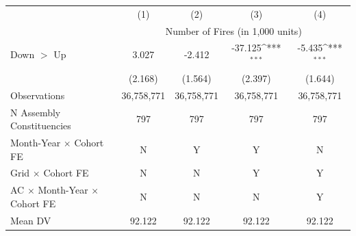 {
\def\sym#1{\ifmmode^{#1}\else\(^{#1}\)\fi}
\begin{tabular}{l*{4}{c}}
\hline
            &\multicolumn{1}{c}{(1)}         &\multicolumn{1}{c}{(2)}         &\multicolumn{1}{c}{(3)}         &\multicolumn{1}{c}{(4)}             \\
            & \multicolumn{4}{c}{Number of Fires (in 1,000 units)} \\ \hline

Down $>$ Up &       3.027         &      -2.412         &     -37.125\sym{***}&      -5.435\sym{***}\\
            &     (2.168)         &     (1.564)         &     (2.397)         &     (1.644)         \\
\hline
Observations&  36,758,771         &  36,758,771         &  36,758,771         &  36,758,771         \\
N Assembly Constituencies&         797         &         797         &         797         &         797         \\
Month-Year $\times$ Cohort FE&           N         &           Y         &           Y         &           N         \\
Grid $\times$ Cohort FE&           N         &           N         &           Y         &           Y         \\
AC $\times$ Month-Year $\times$ Cohort FE&           N         &           N         &           N         &           Y         \\
Mean DV     &      92.122         &      92.122         &      92.122         &      92.122         \\
\hline
\end{tabular}
}
